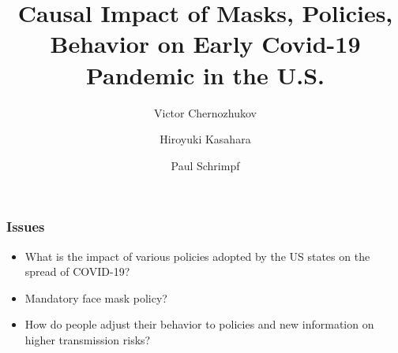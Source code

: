 \documentclass{beamer}
\title[Causal Impact of Masks, Policies, Behavior]
{Causal Impact of Masks, Policies, Behavior on Early Covid-19 Pandemic in the U.S.}
\author[Victor Chernozhukov, Hiroyuki Kasahara, Paul Schrimpf] %
{Victor Chernozhukov\inst{1} \and Hiroyuki Kasahara\inst{2} \and Paul Schrimpf\inst{2}}
\institute[] %
{
  \inst{1}%
  Department of Economics and Center for Statistics and Data Science, MIT
  \and
  \inst{2}%
  Vancouver School of Economics,
  UBC }
\date[July 2020] %
{}
\begin{document}
\begin{frame}
  \titlepage
\end{frame}



\begin{frame}
  \frametitle{Issues}%
\large
\begin{itemize}

\item What is the  impact of various policies adopted by the US states on the spread of COVID-19?\medskip
 
\item Mandatory face mask policy?\medskip

\item How do people adjust their behavior to policies and  new  information on higher transmission risks?
 
\end{itemize}

\end{frame}


 
\end{document}
